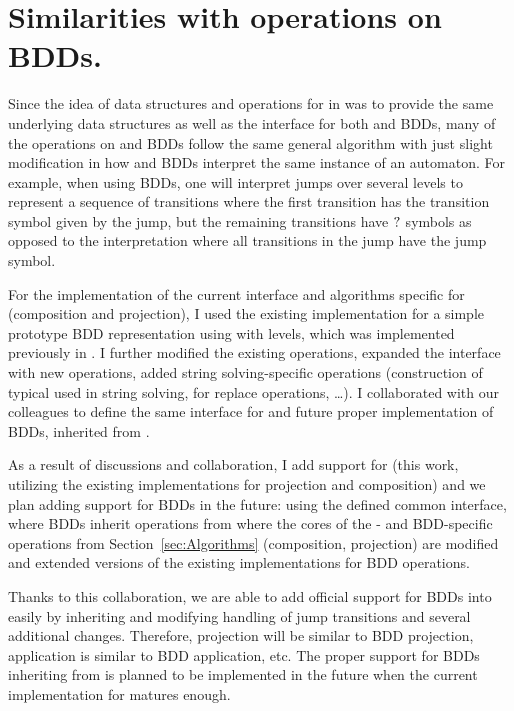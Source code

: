 \section{Similarities with operations on BDDs.}
Since the idea of data structures and operations for \nfts in \mata was to provide the same underlying data structures as well as the interface for both \nfts and BDDs, many of the operations on \nfts and BDDs follow the same general algorithm with just slight modification in how \nfts and BDDs interpret the same instance of an \nft automaton.
For example, when using BDDs, one will interpret jumps over several levels to represent a sequence of transitions where the first transition has the transition symbol given by the jump, but the remaining transitions have $?$ symbols as opposed to the \nft interpretation where all transitions in the jump have the jump symbol.

For the implementation of the current interface and algorithms specific for \nfts (composition and projection), I used the existing implementation for a simple prototype BDD representation using \nfas with levels, which was implemented previously in \mata.
I further modified the existing operations, expanded the interface with new operations, added string solving-specific operations (construction of typical \nfts used in string solving, \nfts for replace operations, \ldots).
I collaborated with our colleagues to define the same interface for \nfts and future proper implementation of BDDs, inherited from \nfts.

As a result of discussions and collaboration, I add support for \nfts (this work, utilizing the existing implementations for projection and composition) and we plan adding support for BDDs in the future: using the defined common interface, where BDDs inherit operations from \nfts where the cores of the \nft- and BDD-specific operations from Section~\ref{sec:Algorithms} (composition, projection) are modified and extended versions of the existing implementations for BDD operations.

Thanks to this collaboration, we are able to add official support for BDDs into \mata easily by inheriting \nft and modifying handling of jump transitions and several additional changes.
Therefore, \nft projection will be similar to BDD projection, \nft application is similar to BDD application, etc.
The proper support for BDDs inheriting from \nfts is planned to be implemented in the future when the current implementation for \nfts matures enough.

